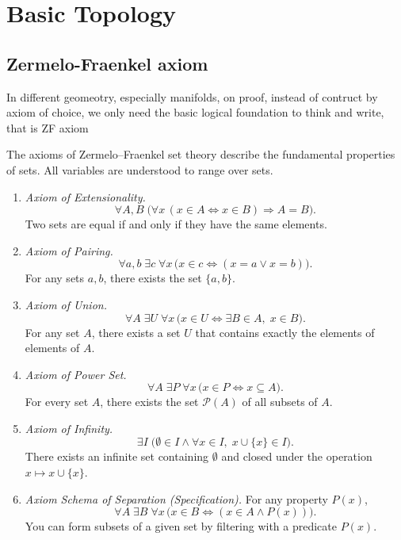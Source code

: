 \chapter{Basic Topology}
\section{Zermelo-Fraenkel axiom}
In different geomeotry, especially manifolds, on proof, instead of contruct by axiom of choice, we only need the basic logical foundation to think and write, that is ZF axiom
\begin{definition}[ZF Axioms]
The axioms of Zermelo--Fraenkel set theory describe the fundamental properties of sets.  
All variables are understood to range over sets.
\end{definition}

\begin{enumerate}
    \item \textit{Axiom of Extensionality.}  
    \[
    \forall A, B \; \big( \forall x\, (x \in A \Leftrightarrow x \in B) \Rightarrow A = B \big).
    \]
    Two sets are equal if and only if they have the same elements.

    \item \textit{Axiom of Pairing.}  
    \[
    \forall a,b \; \exists c \; \forall x\, \big( x \in c \Leftrightarrow (x = a \lor x = b) \big).
    \]
    For any sets \(a,b\), there exists the set \(\{a,b\}\).

    \item \textit{Axiom of Union.}  
    \[
    \forall A \; \exists U \; \forall x\, \big( x \in U \Leftrightarrow \exists B\in A,\; x\in B \big).
    \]
    For any set \(A\), there exists a set \(U\) that contains exactly the elements of elements of \(A\).

    \item \textit{Axiom of Power Set.}  
    \[
    \forall A \; \exists P \; \forall x\, \big( x \in P \Leftrightarrow x \subseteq A \big).
    \]
    For every set \(A\), there exists the set \(\mathcal{P}(A)\) of all subsets of \(A\).

    \item \textit{Axiom of Infinity.}  
    \[
    \exists I \; \big( \emptyset \in I \wedge \forall x\in I,\; x\cup\{x\}\in I \big).
    \]
    There exists an infinite set containing \(\emptyset\) and closed under the operation \(x \mapsto x\cup\{x\}\).

    \item \textit{Axiom Schema of Separation (Specification).}  
    For any property \(P(x)\),
    \[
    \forall A \; \exists B \; \forall x\, \big( x \in B \Leftrightarrow (x\in A \wedge P(x)) \big).
    \]
    You can form subsets of a given set by filtering with a predicate \(P(x)\).


\end{enumerate}
